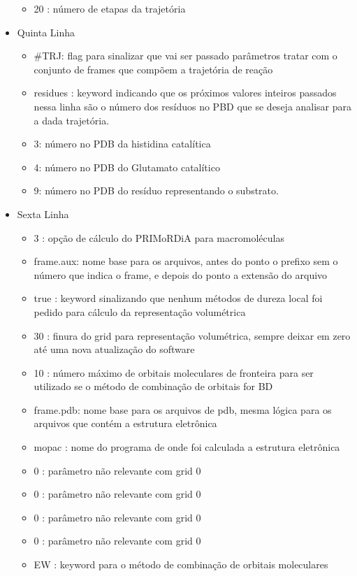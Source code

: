 \documentclass[a4paper,11pt]{refart}
\begin{document}
\begin{itemize}
\begin{itemize}
	 		\item 20        : número de etapas da trajetória
	 	\end{itemize}
	 	\item Quinta Linha 
	 	\begin{itemize}
	 		\item \#TRJ: flag para sinalizar que vai ser passado parâmetros tratar com o conjunto de frames que compõem a trajetória de reação
	 		\item residues    : keyword indicando que os próximos valores inteiros passados nessa linha são o número dos resíduos no PBD que se deseja analisar para a dada trajetória.
	 		\item 3: número no PDB da histidina catalítica
	 		\item 4: número no PDB do Glutamato catalítico
	 		\item 9: número no PDB do resíduo representando o substrato.  
	 	\end{itemize}
	 	\item Sexta Linha 
	 	\begin{itemize}
	 		\item 3      : opção de cálculo do PRIMoRDiA para macromoléculas
	 		\item frame.aux: nome base para os arquivos, antes do ponto o prefixo sem o número que indica o frame, e depois do ponto a extensão do arquivo
	 		\item true   : keyword sinalizando que nenhum métodos de dureza local foi pedido para cálculo da representação volumétrica
	 		\item 30      : finura do grid para representação volumétrica, sempre deixar em zero até uma nova atualização do software
	 		\item 10     : número máximo de orbitais moleculares de fronteira para ser utilizado se o método de combinação de orbitais for BD
	 		\item frame.pdb: nome base para os arquivos de pdb, mesma lógica para os arquivos que contém a estrutura eletrônica
	 		\item mopac  : nome do programa de onde foi calculada a estrutura eletrônica
	 		\item 0      : parâmetro não relevante com grid 0
	 		\item 0      : parâmetro não relevante com grid 0
	 		\item 0      : parâmetro não relevante com grid 0
	 		\item 0      : parâmetro não relevante com grid 0
	 		\item EW     : keyword para o método de combinação de orbitais moleculares
	 	\end{itemize}
	 \end{itemize}
	 
\end{document}
